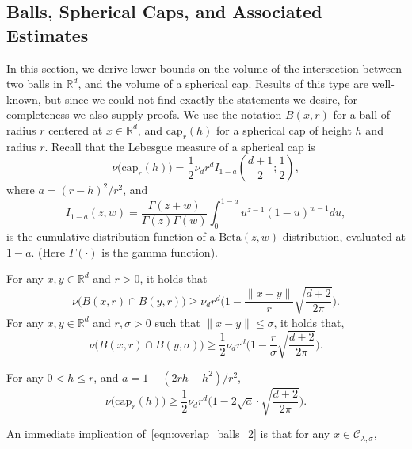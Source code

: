 \documentclass[twoside,11pt]{article}
\newcommand{\Reals}{\mathbb{R}}
\newcommand{\1}{\mathbf{1}}
\newcommand{\Rd}{\Reals^d}
\newcommand{\mc}[1]{\mathcal{#1}}
\begin{document}
\subsection{Balls, Spherical Caps, and Associated Estimates}
\label{subsec:spherical_caps}
In this section, we derive lower bounds on the volume of the intersection between two balls in $\Rd$, and the volume of a spherical cap. Results of this type are well-known, but since we could not find exactly the statements we desire, for completeness we also supply proofs. We use the notation $B(x,r)$ for a ball of radius $r$ centered at $x \in \Rd$, and $\mathrm{cap}_{r}(h)$ for a spherical cap of height $h$ and radius $r$. Recall that the Lebesgue measure of a spherical cap is
\begin{equation*}
\nu\bigl(\mathrm{cap}_r(h)\bigr) = \frac{1}{2} \nu_d r^d I_{1 - a}\left(\frac{d + 1}{2}; \frac{1}{2}\right),
\end{equation*}
where $a = (r - h)^2/r^2$, and
\begin{equation*}
I_{1 - a}(z,w) = \frac{\Gamma(z + w)}{\Gamma(z) \Gamma(w)} \int_{0}^{1 - a} u^{z - 1} (1 - u)^{w - 1} du,
\end{equation*}
is the cumulative distribution function of a $\mathrm{Beta}(z,w)$ distribution, evaluated at $1 - a$. (Here $\Gamma(\cdot)$ is the gamma function).
\begin{lemma}
	\label{lem:overlap_balls}
	For any $x,y \in \Rd$ and $r > 0$, it holds that
	\begin{equation}
	\label{eqn:overlap_balls_1}
	\nu\bigl(B(x,r) \cap B(y,r)\bigr) \geq \nu_d r^d\biggl(1 - \frac{\|x - y\|}{r} \sqrt{\frac{d + 2}{2\pi}}\biggr).
	\end{equation}
	For any $x,y \in \Rd$ and $r,\sigma > 0$ such that $\|x - y\| \leq \sigma$, it holds that,
	\begin{equation}
	\label{eqn:overlap_balls_2}
	\nu\bigl(B(x,r) \cap B(y,\sigma)\bigr) \geq \frac{1}{2} \nu_d r^d\biggl(1 - \frac{r}{\sigma}\sqrt{\frac{d + 2}{2\pi}}\biggr).
	\end{equation}
\end{lemma}
\begin{lemma}
	\label{lem:volume_of_spherical_cap}
	For any $0 < h \leq r$, and $a = 1 - (2 r h - h^2)/r^2$,
	\begin{equation*}
	\nu\bigl(\mathrm{cap}_r(h)\bigr) \geq \frac{1}{2}\nu_dr^d\biggl(1 - 2\sqrt{a} \cdot \sqrt{\frac{d + 2}{2\pi}}\biggr).
	\end{equation*}
\end{lemma}
An immediate implication of~\eqref{eqn:overlap_balls_2} is that for any $x \in \mc{C}_{\lambda,\sigma}$,
\end{document}
